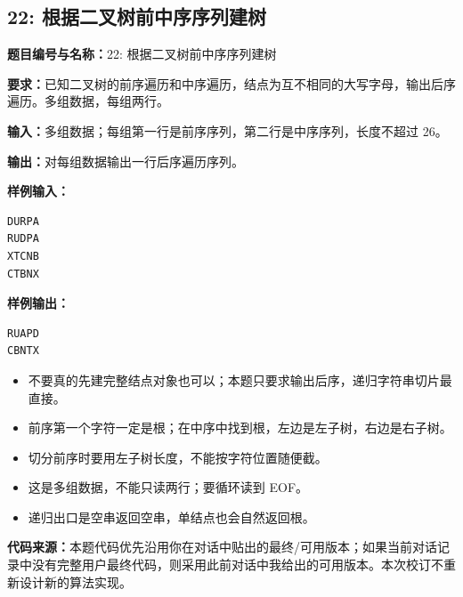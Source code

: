 \documentclass[10pt,a4paper,fontset=none]{ctexart}
\newcommand{\codesource}{\par\noindent\textbf{代码来源：}本题代码优先沿用你在对话中贴出的最终/可用版本；如果当前对话记录中没有完整用户最终代码，则采用此前对话中我给出的可用版本。本次校订不重新设计新的算法实现。\par\vspace{0.2em}}
\begin{document}
\subsection{22: 根据二叉树前中序序列建树}
\begin{taskbox}
\textbf{题目编号与名称：}22: 根据二叉树前中序序列建树\par
\textbf{要求：}已知二叉树的前序遍历和中序遍历，结点为互不相同的大写字母，输出后序遍历。多组数据，每组两行。\par
\textbf{输入：}多组数据；每组第一行是前序序列，第二行是中序序列，长度不超过 26。\par
\textbf{输出：}对每组数据输出一行后序遍历序列。\par
\textbf{样例输入：}
\begin{lstlisting}[style=sample]
DURPA
RUDPA
XTCNB
CTBNX
\end{lstlisting}
\textbf{样例输出：}
\begin{lstlisting}[style=sample]
RUAPD
CBNTX
\end{lstlisting}
\end{taskbox}
\begin{mistakebox}
\begin{itemize}
  \item 不要真的先建完整结点对象也可以；本题只要求输出后序，递归字符串切片最直接。
  \item 前序第一个字符一定是根；在中序中找到根，左边是左子树，右边是右子树。
  \item 切分前序时要用左子树长度，不能按字符位置随便截。
  \item 这是多组数据，不能只读两行；要循环读到 EOF。
  \item 递归出口是空串返回空串，单结点也会自然返回根。
\end{itemize}
\end{mistakebox}
\codesource
\end{document}
